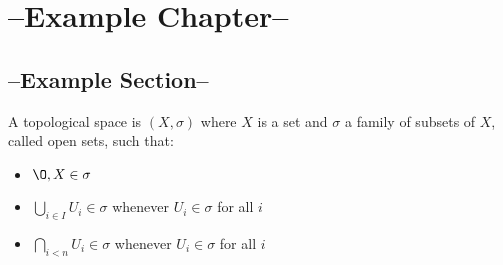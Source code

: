 \chapter{--Example Chapter--}
\setcounter{section}{-1}
\section{--Example Section--}

\begin{definition}
    A topological space is $(X, \sigma)$ where  $X$ is a set and $\sigma$
  a family of subsets of $X$, called  open sets, such that:
    \begin{itemize}
        \item $\O, X \in \sigma$ 
        \item $\bigcup_{i \in I} U_i \in \sigma$ whenever $ U_i \in \sigma$ for all $i$
        \item $\bigcap_{i<n} U_i \in \sigma$ whenever $ U_i \in \sigma$ for all $i$
    \end{itemize}
\end{definition}